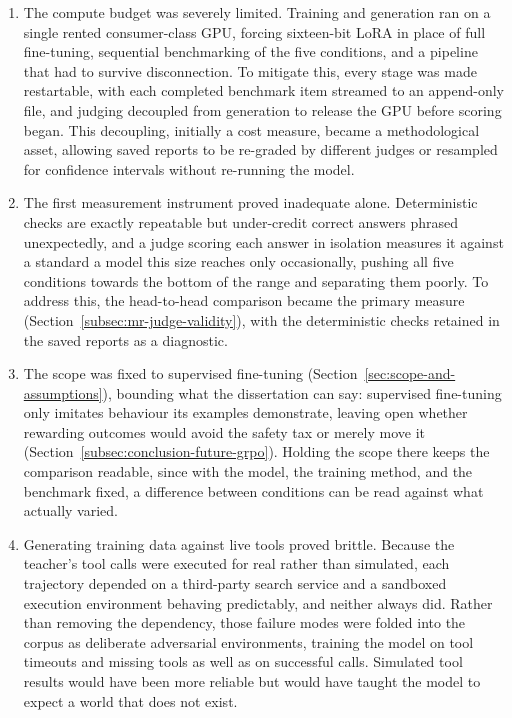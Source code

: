 \begin{enumerate}

   \item The compute budget was severely limited. Training and generation ran on a single rented consumer-class GPU, forcing sixteen-bit LoRA in place of full fine-tuning, sequential benchmarking of the five conditions, and a pipeline that had to survive disconnection. To mitigate this, every stage was made restartable, with each completed benchmark item streamed to an append-only file, and judging decoupled from generation to release the GPU before scoring began. This decoupling, initially a cost measure, became a methodological asset, allowing saved reports to be re-graded by different judges or resampled for confidence intervals without re-running the model.

   \item The first measurement instrument proved inadequate alone. Deterministic checks are exactly repeatable but under-credit correct answers phrased unexpectedly, and a judge scoring each answer in isolation measures it against a standard a model this size reaches only occasionally, pushing all five conditions towards the bottom of the range and separating them poorly. To address this, the head-to-head comparison became the primary measure (Section~\ref{subsec:mr-judge-validity}), with the deterministic checks retained in the saved reports as a diagnostic.

   \item The scope was fixed to supervised fine-tuning (Section~\ref{sec:scope-and-assumptions}), bounding what the dissertation can say: supervised fine-tuning only imitates behaviour its examples demonstrate, leaving open whether rewarding outcomes would avoid the safety tax or merely move it (Section~\ref{subsec:conclusion-future-grpo}). Holding the scope there keeps the comparison readable, since with the model, the training method, and the benchmark fixed, a difference between conditions can be read against what actually varied.

   \item Generating training data against live tools proved brittle. Because the teacher's tool calls were executed for real rather than simulated, each trajectory depended on a third-party search service and a sandboxed execution environment behaving predictably, and neither always did. Rather than removing the dependency, those failure modes were folded into the corpus as deliberate adversarial environments, training the model on tool timeouts and missing tools as well as on successful calls. Simulated tool results would have been more reliable but would have taught the model to expect a world that does not exist.

\end{enumerate}

